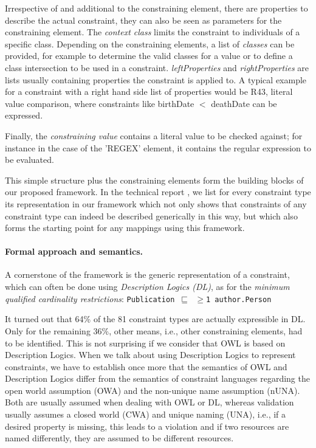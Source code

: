 \documentclass[a4paper,fontsize=11pt]{scrartcl}
\newcommand{\ms}[1]{\texttt{#1}}
\begin{document}
Irrespective of and additional to the constraining element, there are properties to describe the actual constraint, they can also be seen as parameters for the constraining element. The \emph{context class} limits the constraint to individuals of a specific class. Depending on the constraining elements, a list of \emph{classes} can be provided, for example to determine the valid classes for a value or to define a class intersection to be used in a constraint. \emph{leftProperties} and \emph{rightProperties} are lists usually containing properties the constraint is applied to. A typical example for a constraint with a right hand side list of properties would be R43, literal value comparison, where constraints like birthDate $<$ deathDate can be expressed.

Finally, the \emph{constraining value} contains a literal value to be checked against; for instance in the case of the 'REGEX' element, it contains the regular expression to be evaluated.

This simple structure plus the constraining elements form the building blocks of our proposed framework. In the technical report \cite{BoschNolleAcarEckert2015}, we list for every constraint type its representation in our framework which not only shows that constraints of any constraint type can indeed be described generically in this way, but which also forms the starting point for any mappings using this framework.

\paragraph{Formal approach and semantics.}

A cornerstone of the framework is the generic representation of a constraint, which can often be done using \emph{Description Logics (DL)}, as for the \emph{minimum qualified cardinality restrictions}: {\small\ms{Publication $\sqsubseteq$ $\geq$1 author.Person}}

It turned out that 64\% of the 81 constraint types are actually expressible in DL. Only for the remaining 36\%, other means, i.e., other constraining elements, had to be identified. This is not surprising if we consider that OWL is based on Description Logics. When we talk about using Description Logics to represent constraints, we have to establish once more that the semantics of OWL and Description Logics differ from the semantics of constraint languages regarding the open world assumption (OWA) and the non-unique name assumption (nUNA). Both are usually assumed when dealing with OWL or DL, whereas validation usually assumes a closed world (CWA) and unique naming (UNA), i.e., if a desired property is missing, this leads to a violation and if two resources are named differently, they are assumed to be different resources. 
\end{document}

